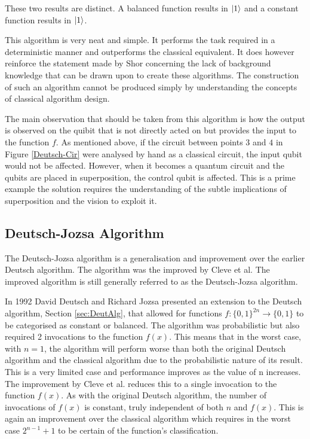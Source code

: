 These two results are distinct.
A balanced function results in $\left\vert{1}\right\rangle$ and a constant function results in $\left\vert{1}\right\rangle$.

This algorithm is very neat and simple.
It performs the task required in a deterministic manner and outperforms the classical equivalent.
It does however reinforce the statement made by Shor\cite{Shor:2004:PQA:1032132.1032149} concerning the lack of background knowledge that can be drawn upon to create these algorithms.
The construction of such an algorithm cannot be produced simply by understanding the concepts of classical algorithm design.

The main observation that should be taken from this algorithm is how the output is observed on the quibit that is not directly acted on but provides the input to the function $f$.
As mentioned above, if the circuit between points $3$ and $4$ in Figure \ref{Deutsch-Cir} were analysed by hand as a classical circuit, the input qubit would not be affected.
However, when it becomes a quantum circuit and the qubits are placed in superposition, the control qubit is affected.
This is a prime example the solution requires the understanding of the subtle implications of superposition and the vision to exploit it.

\subsection{Deutsch-Jozsa Algorithm}
\label{sec:DeutJozsaAlg}

The Deutsch-Jozsa algorithm\cite{1992-deutsch} is a generalisation and improvement over the earlier Deutsch algorithm\cite{Deutsch85quantumtheory}.
The algorithm was the improved by Cleve et al.\cite{Cleve98quantumalgorithms}
The improved algorithm is still generally referred to as the Deutsch-Jozsa algorithm.

In 1992 David Deutsch and Richard Jozsa\cite{1992-deutsch} presented an extension to the Deutsch algorithm, Section \ref{sec:DeutAlg}, that allowed for functions $f:\{0,1\}^{2n}\to\{0,1\}$ to be categorised as constant or balanced.
The algorithm was probabilistic but also required 2 invocations to the function $f(x)$.
This means that in the worst case, with $n=1$, the algorithm will perform worse than both the original Deutsch algorithm\cite{Deutsch85quantumtheory} and the classical algorithm due to the probabilistic nature of its result.
This is a very limited case and performance improves as the value of n increases.
The improvement by Cleve et al. reduces this to a single invocation to the function $f(x)$.
As with the original Deutsch algorithm, the number of invocations of $f(x)$ is constant, truly independent of both $n$ and $f(x)$.
This is again an improvement over the classical algorithm which requires in the worst case $2^{n-1}+1$ to be certain of the function's classification.

